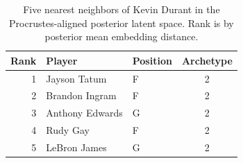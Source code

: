 \begin{table}[htbp]
  \centering\small
  \begin{tabular}{rllc}
    \toprule
    Rank & Player & Position & Archetype \\
    \midrule
    1 & Jayson Tatum & F & 2 \\
    2 & Brandon Ingram & F & 2 \\
    3 & Anthony Edwards & G & 2 \\
    4 & Rudy Gay & F & 2 \\
    5 & LeBron James & G & 2 \\
    \bottomrule
  \end{tabular}
  \caption{Five nearest neighbors of Kevin Durant in the Procrustes-aligned posterior latent space. Rank is by posterior mean embedding distance.}
  \label{tab:Kevin_Durant_neighbors}
\end{table}

